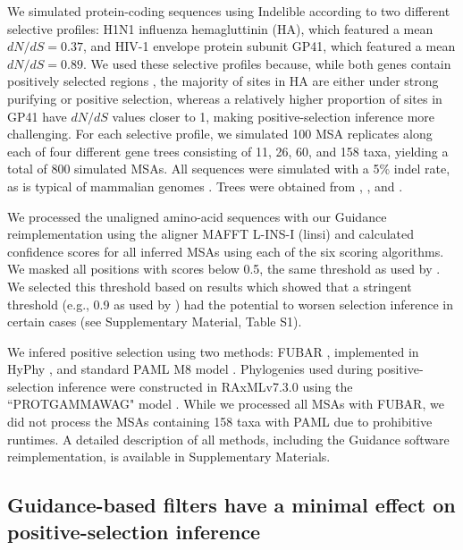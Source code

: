 \documentclass[11pt]{article}
\begin{document}
We simulated protein-coding sequences using Indelible \citep{Fletcher2009} according to two different selective profiles: H1N1 influenza hemagluttinin (HA), which featured a mean $dN/dS = 0.37$, and HIV-1 envelope protein subunit GP41, which featured a mean $dN/dS = 0.89$. We used these selective profiles because, while both genes contain positively selected regions \citep{Bush1999, Frost2001, Bandawe2008, Meyer2012}, the majority of sites in HA are either under strong purifying or positive selection, whereas a relatively higher proportion of sites in GP41 have $dN/dS$ values closer to 1, making positive-selection inference more challenging. For each selective profile, we simulated 100 MSA replicates along each of four different gene trees consisting of 11, 26, 60, and 158 taxa, yielding a total of 800 simulated MSAs. All sequences were simulated with a 5\% indel rate, as is typical of mammalian genomes \citep{Cooper2004}. Trees were obtained from \citet{Spielman2013}, \citet{Yang2011}, and \citet{Betancur2013}.

We processed the unaligned amino-acid sequences with our Guidance reimplementation using the aligner MAFFT L-INS-I (linsi) \citep{Katoh2002,Katoh2005} and calculated confidence scores for all inferred MSAs using each of the six scoring algorithms. We masked all positions with scores below 0.5, the same threshold as used by \citet{Jordan2012}. We selected this threshold based on results which showed that a stringent threshold (e.g., 0.9 as used by \citealt{Privman2012}) had the potential to worsen selection inference in certain cases (see Supplementary Material, Table S1).

We infered positive selection using two methods: FUBAR \citep{Murrell2013}, implemented in HyPhy \citep{Pond2005}, and standard PAML M8 model \citep{Yang2000, Yang2007}. Phylogenies used during positive-selection inference were constructed in RAxMLv7.3.0 using the ``PROTGAMMAWAG" model \citep{Stamatakis2006}. While we processed all MSAs with FUBAR, we did not process the MSAs containing 158 taxa with PAML due to prohibitive runtimes. A detailed description of all methods, including the Guidance software reimplementation, is available in Supplementary Materials.


\subsection*{Guidance-based filters have a minimal effect on positive-selection inference}
\end{document}
